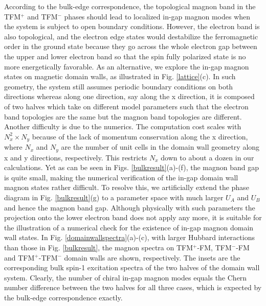 \documentclass[amsmath,superscriptaddress,showpacs,aps,prl,twocolumn]{revtex4-1}
\begin{document}
\par According to the bulk-edge correspondence, the topological magnon band in the TFM$^+$ and TFM$^-$ phases should lead to localized in-gap magnon modes when the system is subject to open boundary conditions. However, the electron band is also topological, and the electron edge states would destabilize the ferromagnetic order in the ground state because they go across the whole electron gap between the upper and lower electron band so that the spin fully polarized state is no more energetically favorable. As an alternative, we explore the in-gap magnon states on magnetic domain walls, as illustrated in Fig. \ref{lattice}(c). In such geometry, the system still assumes periodic boundary conditions on both directions whereas along one direction, say along the x direction, it is composed of two halves which take on different model parameters such that the electron band topologies are the same but the magnon band topologies are different. Another difficulty is due to the numerics. The computation cost scales with $N_x^2\times N_y$ because of the lack of momentum conservation along the x direction, where $N_x$ and $N_y$ are the number of unit cells in the domain wall geometry along x and y directions, respectively. This restricts $N_x$ down to about a dozen in our calculations. Yet as can be seen in Figs. \ref{bulkresult}(a)-(f), the magnon band gap is quite small, making the numerical verification of the in-gap domain wall magnon states rather difficult. To resolve this, we artificially extend the phase diagram in Fig. \ref{bulkresult}(g) to a parameter space with much larger $U_A$ and $U_B$ and hence the magnon band gap. Although physically with such parameters the projection onto the lower electron band does not apply any more, it is suitable for the illustration of a numerical check for the existence of in-gap magnon domain wall states. In Fig. \ref{domainwallspectra}(a)-(c), with larger Hubbard interactions than those in Fig. \ref{bulkresult}, the magnon spectra on TFM$^+$-FM, TFM$^-$-FM and TFM$^+$-TFM$^-$ domain walls are shown, respectively. The insets are the corresponding bulk spin-1 excitation spectra of the two halves of the domain wall system. Clearly, the number of chiral in-gap magnon modes equals the Chern number difference between the two halves for all three cases, which is expected by the bulk-edge correspondence exactly.
\end{document}
